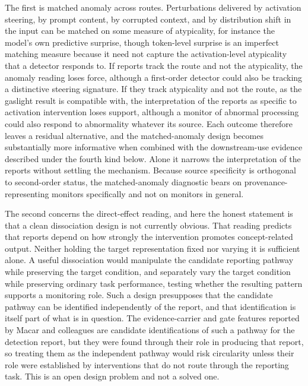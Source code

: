 \documentclass[11pt]{article}
\theoremstyle{definition}
\theoremstyle{remark}
\begin{document}
The first is matched anomaly across routes. Perturbations delivered by activation steering, by prompt content, by corrupted context, and by distribution shift in the input can be matched on some measure of atypicality, for instance the model's own predictive surprise, though token-level surprise is an imperfect matching measure because it need not capture the activation-level atypicality that a detector responds to. If reports track the route and not the atypicality, the anomaly reading loses force, although a first-order detector could also be tracking a distinctive steering signature. If they track atypicality and not the route, as the gaslight result is compatible with, the interpretation of the reports as specific to activation intervention loses support, although a monitor of abnormal processing could also respond to abnormality whatever its source. Each outcome therefore leaves a residual alternative, and the matched-anomaly design becomes substantially more informative when combined with the downstream-use evidence described under the fourth kind below. Alone it narrows the interpretation of the reports without settling the mechanism. Because source specificity is orthogonal to second-order status, the matched-anomaly diagnostic bears on provenance-representing monitors specifically and not on monitors in general.

The second concerns the direct-effect reading, and here the honest statement is that a clean dissociation design is not currently obvious. That reading predicts that reports depend on how strongly the intervention promotes concept-related output. Neither holding the target representation fixed nor varying it is sufficient alone. A useful dissociation would manipulate the candidate reporting pathway while preserving the target condition, and separately vary the target condition while preserving ordinary task performance, testing whether the resulting pattern supports a monitoring role. Such a design presupposes that the candidate pathway can be identified independently of the report, and that identification is itself part of what is in question. The evidence-carrier and gate features reported by Macar and colleagues are candidate identifications of such a pathway for the detection report, but they were found through their role in producing that report, so treating them as the independent pathway would risk circularity unless their role were established by interventions that do not route through the reporting task. This is an open design problem and not a solved one.
\end{document}
